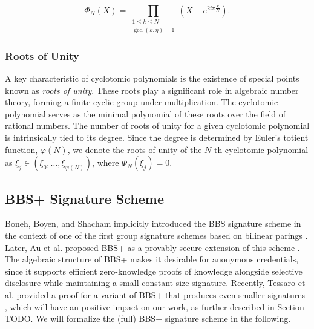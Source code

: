 \begin{equation}
\label{eq:prelim_cyclotomic_poly}
\Phi_N(X)=\prod_{\substack{1 \leq k \leq N \\ \operatorname{gcd}(k, \eta)=1}}\left(X-e^{2 i \pi \frac{k}{N}}\right).
\end{equation}

\subsubsection{Roots of Unity}
A key characteristic of cyclotomic polynomials is the existence of special points known as \textit{roots of unity}. These roots play a significant role in algebraic number theory, forming a finite cyclic group under multiplication. The cyclotomic polynomial serves as the minimal polynomial of these roots over the field of rational numbers. The number of roots of unity for a given cyclotomic polynomial is intrinsically tied to its degree. Since the degree is determined by Euler's totient function, $\varphi(N)$, we denote the roots of unity of the $N$-th cyclotomic polynomial as $\xi_j \in (\xi_0, \ldots, \xi_{\varphi(N)})$, where $\Phi_N(\xi_j) = 0$. 


\subsection{BBS+ Signature Scheme}
\label{subsec:prelim_bbs}
Boneh, Boyen, and Shacham implicitly introduced the BBS signature scheme in the context of one of the first group signature schemes based on bilinear parings \cite{boneh2004short}. Later, Au et al. proposed BBS+ as a provably secure extension of this scheme \cite{au2006constant}. The algebraic structure of BBS+ makes it desirable for anonymous credentials, since it supports efficient zero-knowledge proofs of knowledge alongside selective disclosure while maintaining a small constant-size signature. Recently, Tessaro et al. provided a proof for a variant of BBS+ that produces even smaller signatures \cite{tessaro2023revisiting}, which will have an positive impact on our work, as further described in Section TODO. We will formalize the (full) BBS+ signature scheme in the following.

